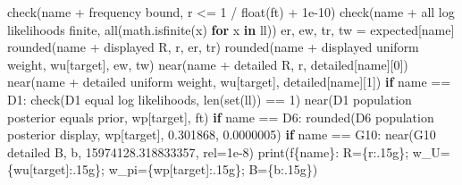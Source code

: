 \documentclass[
]{article}
\newenvironment{Shaded}{}{}
\newcommand{\BuiltInTok}[1]{\textcolor[rgb]{0.00,0.50,0.00}{#1}}
\newcommand{\ControlFlowTok}[1]{\textcolor[rgb]{0.00,0.44,0.13}{\textbf{#1}}}
\newcommand{\DecValTok}[1]{\textcolor[rgb]{0.25,0.63,0.44}{#1}}
\newcommand{\FloatTok}[1]{\textcolor[rgb]{0.25,0.63,0.44}{#1}}
\newcommand{\KeywordTok}[1]{\textcolor[rgb]{0.00,0.44,0.13}{\textbf{#1}}}
\newcommand{\NormalTok}[1]{#1}
\newcommand{\OperatorTok}[1]{\textcolor[rgb]{0.40,0.40,0.40}{#1}}
\newcommand{\SpecialCharTok}[1]{\textcolor[rgb]{0.25,0.44,0.63}{#1}}
\newcommand{\SpecialStringTok}[1]{\textcolor[rgb]{0.73,0.40,0.53}{#1}}
\newcommand{\StringTok}[1]{\textcolor[rgb]{0.25,0.44,0.63}{#1}}
\begin{document}
\begin{Shaded}
\begin{Highlighting}[]
\NormalTok{        check(name }\OperatorTok{+} \StringTok{\textquotesingle{} frequency bound\textquotesingle{}}\NormalTok{, r }\OperatorTok{\textless{}=} \DecValTok{1} \OperatorTok{/} \BuiltInTok{float}\NormalTok{(ft) }\OperatorTok{+} \FloatTok{1e{-}10}\NormalTok{)}
\NormalTok{        check(name }\OperatorTok{+} \StringTok{\textquotesingle{} all log likelihoods finite\textquotesingle{}}\NormalTok{, }\BuiltInTok{all}\NormalTok{(math.isfinite(x) }\ControlFlowTok{for}\NormalTok{ x }\KeywordTok{in}\NormalTok{ ll))}
\NormalTok{        er, ew, tr, tw }\OperatorTok{=}\NormalTok{ expected[name]}
\NormalTok{        rounded(name }\OperatorTok{+} \StringTok{\textquotesingle{} displayed R\textquotesingle{}}\NormalTok{, r, er, tr)}
\NormalTok{        rounded(name }\OperatorTok{+} \StringTok{\textquotesingle{} displayed uniform weight\textquotesingle{}}\NormalTok{, wu[target], ew, tw)}
\NormalTok{        near(name }\OperatorTok{+} \StringTok{\textquotesingle{} detailed R\textquotesingle{}}\NormalTok{, r, detailed[name][}\DecValTok{0}\NormalTok{])}
\NormalTok{        near(name }\OperatorTok{+} \StringTok{\textquotesingle{} detailed uniform weight\textquotesingle{}}\NormalTok{, wu[target], detailed[name][}\DecValTok{1}\NormalTok{])}
        \ControlFlowTok{if}\NormalTok{ name }\OperatorTok{==} \StringTok{\textquotesingle{}D1\textquotesingle{}}\NormalTok{:}
\NormalTok{            check(}\StringTok{\textquotesingle{}D1 equal log likelihoods\textquotesingle{}}\NormalTok{, }\BuiltInTok{len}\NormalTok{(}\BuiltInTok{set}\NormalTok{(ll)) }\OperatorTok{==} \DecValTok{1}\NormalTok{)}
\NormalTok{            near(}\StringTok{\textquotesingle{}D1 population posterior equals prior\textquotesingle{}}\NormalTok{, wp[target], ft)}
        \ControlFlowTok{if}\NormalTok{ name }\OperatorTok{==} \StringTok{\textquotesingle{}D6\textquotesingle{}}\NormalTok{:}
\NormalTok{            rounded(}\StringTok{\textquotesingle{}D6 population posterior display\textquotesingle{}}\NormalTok{, wp[target], }\FloatTok{0.301868}\NormalTok{, }\FloatTok{0.0000005}\NormalTok{)}
        \ControlFlowTok{if}\NormalTok{ name }\OperatorTok{==} \StringTok{\textquotesingle{}G10\textquotesingle{}}\NormalTok{:}
\NormalTok{            near(}\StringTok{\textquotesingle{}G10 detailed B\textquotesingle{}}\NormalTok{, b, }\FloatTok{15974128.318833357}\NormalTok{, rel}\OperatorTok{=}\FloatTok{1e{-}8}\NormalTok{)}
        \BuiltInTok{print}\NormalTok{(}\SpecialStringTok{f\textquotesingle{}}\SpecialCharTok{\{}\NormalTok{name}\SpecialCharTok{\}}\SpecialStringTok{: R=}\SpecialCharTok{\{}\NormalTok{r}\SpecialCharTok{:.15g\}}\SpecialStringTok{; w\_U=}\SpecialCharTok{\{}\NormalTok{wu[target]}\SpecialCharTok{:.15g\}}\SpecialStringTok{; w\_pi=}\SpecialCharTok{\{}\NormalTok{wp[target]}\SpecialCharTok{:.15g\}}\SpecialStringTok{; B=}\SpecialCharTok{\{}\NormalTok{b}\SpecialCharTok{:.15g\}}\SpecialStringTok{\textquotesingle{}}\NormalTok{)}



\end{Highlighting}
\end{Shaded}
\end{document}
